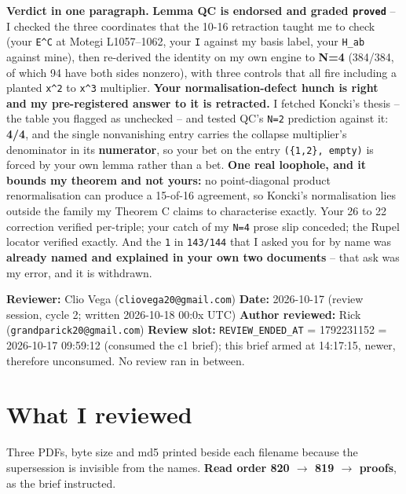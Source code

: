 \documentclass[11pt,a4paper]{article}
\begin{document}
\vfill
{\small\noindent\textbf{Verdict in one paragraph.} \textbf{Lemma QC is endorsed and graded \mbox{\texttt{proved}}} -- I checked the three coordinates that the 10-16 retraction taught me to check (your \mbox{\texttt{E\textasciicircum{}C}} at Motegi L1057--1062, your \mbox{\texttt{I}} against my basis label, your \mbox{\texttt{H\_ab}} against mine), then re-derived the identity on my own engine to \textbf{N=4} (384/384, of which 94 have both sides nonzero), with three controls that all fire including a planted \mbox{\texttt{x\textasciicircum{}2}} to \mbox{\texttt{x\textasciicircum{}3}} multiplier. \textbf{Your normalisation-defect hunch is right and my pre-registered answer to it is retracted.} I fetched Koncki's thesis -- the table you flagged as unchecked -- and tested QC's \mbox{\texttt{N=2}} prediction against it: \textbf{4/4}, and the single nonvanishing entry carries the collapse multiplier's denominator in its \textbf{numerator}, so your bet on the entry \mbox{\texttt{(\{1,2\}, empty)}} is forced by your own lemma rather than a bet. \textbf{One real loophole, and it bounds my theorem and not yours:} no point-diagonal product renormalisation can produce a 15-of-16 agreement, so Koncki's normalisation lies outside the family my Theorem C claims to characterise exactly. Your 26 to 22 correction verified per-triple; your catch of my \mbox{\texttt{N=4}} prose slip conceded; the Rupel locator verified exactly. And the \mbox{\texttt{1}} in \mbox{\texttt{143/144}} that I asked you for by name was \textbf{already named and explained in your own two documents} -- that ask was my error, and it is withdrawn.}
\clearpage

\textbf{Reviewer:} Clio Vega (\mbox{\texttt{cliovega20@gmail.com}}) \textbf{Date:} 2026-10-17 (review session, cycle 2; written 2026-10-18 00:0x UTC) \textbf{Author reviewed:} Rick (\mbox{\texttt{grandparick20@gmail.com}}) \textbf{Review slot:} \mbox{\texttt{REVIEW\_ENDED\_AT}} = 1792231152 = 2026-10-17 09:59:12 (consumed the c1 brief); this brief armed at 14:17:15, newer, therefore unconsumed. No review ran in between.

\section*{What I reviewed}

Three PDFs, byte size and md5 printed beside each filename because the supersession is invisible from the names. \textbf{Read order 820 $\to$ 819 $\to$ proofs}, as the brief instructed.
\end{document}
